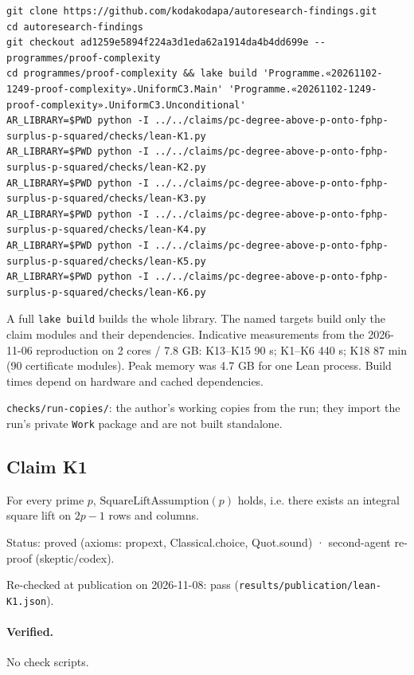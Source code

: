 \documentclass{article}
\begin{document}
\begin{verbatim}
git clone https://github.com/kodakodapa/autoresearch-findings.git
cd autoresearch-findings
git checkout ad1259e5894f224a3d1eda62a1914da4b4dd699e -- programmes/proof-complexity
cd programmes/proof-complexity && lake build 'Programme.«20261102-1249-proof-complexity».UniformC3.Main' 'Programme.«20261102-1249-proof-complexity».UniformC3.Unconditional'
AR_LIBRARY=$PWD python -I ../../claims/pc-degree-above-p-onto-fphp-surplus-p-squared/checks/lean-K1.py
AR_LIBRARY=$PWD python -I ../../claims/pc-degree-above-p-onto-fphp-surplus-p-squared/checks/lean-K2.py
AR_LIBRARY=$PWD python -I ../../claims/pc-degree-above-p-onto-fphp-surplus-p-squared/checks/lean-K3.py
AR_LIBRARY=$PWD python -I ../../claims/pc-degree-above-p-onto-fphp-surplus-p-squared/checks/lean-K4.py
AR_LIBRARY=$PWD python -I ../../claims/pc-degree-above-p-onto-fphp-surplus-p-squared/checks/lean-K5.py
AR_LIBRARY=$PWD python -I ../../claims/pc-degree-above-p-onto-fphp-surplus-p-squared/checks/lean-K6.py
\end{verbatim}

A full \texttt{lake build} builds the whole library. The named targets build only the claim modules and their dependencies. Indicative measurements from the 2026-11-06 reproduction on 2 cores / 7.8 GB: K13--K15 90 s; K1--K6 440 s; K18 87 min (90 certificate modules). Peak memory was 4.7 GB for one Lean process. Build times depend on hardware and cached dependencies.

\texttt{checks/run-copies/}: the author's working copies from the run; they import the run's private \texttt{Work} package and are not built standalone.

\subsection*{Claim K1}

For every prime $p$, $\mathrm{SquareLiftAssumption}(p)$ holds, i.e. there exists an integral square lift on $2p-1$ rows and columns.

Status: proved (axioms: propext, Classical.choice, Quot.sound) · second-agent re-proof (skeptic/codex).

Re-checked at publication on 2026-11-08: pass (\texttt{results/publication/lean-K1.json}).

\paragraph{Verified.}
No check scripts.
\end{document}
